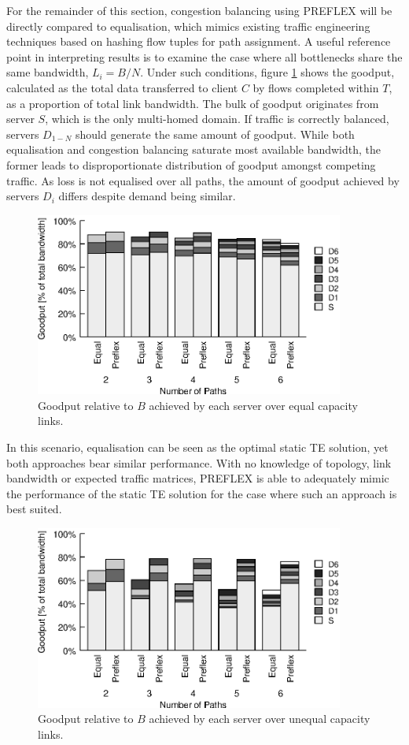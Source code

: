For the remainder of this section, congestion balancing using \ac{PREFLEX} will be directly compared to equalisation, which mimics existing traffic engineering techniques based on hashing flow tuples for path assignment.
A useful reference point in interpreting results is to examine the case where all bottlenecks share the same bandwidth, $L_i=B/N$.
Under such conditions, figure \ref{fig:goodputeq} shows the goodput, calculated as the total data transferred to client $C$ by flows completed within $T$, as a proportion of total link bandwidth.
The bulk of goodput originates from server $S$, which is the only multi-homed domain.
If traffic is correctly balanced, servers $D_{1-N}$ should generate the same amount of goodput.
While both equalisation and congestion balancing saturate most available bandwidth, the former leads to disproportionate distribution of goodput amongst competing traffic. 
As loss is not equalised over all paths, the amount of goodput achieved by servers $D_i$ differs despite demand being similar.
\begin{figure}
    \centering
    \includegraphics[width=4in]{figures/cate/eqbw}
    \caption[Goodput achieved over equal capacity links.]{Goodput relative to $B$ achieved by each server over equal capacity links.}
    \label{fig:goodputeq}
\end{figure}

In this scenario, equalisation can be seen as the optimal static TE solution, yet both approaches bear similar performance. 
With no knowledge of topology, link bandwidth or expected traffic matrices, \ac{PREFLEX} is able to adequately mimic the performance of the static TE solution for the case where such an approach is best suited.

\begin{figure}
    \centering
    \includegraphics[width=4in]{figures/cate/diffbw}
    \caption[Goodput achieved over unequal capacity links.]{Goodput relative to $B$ achieved by each server over unequal capacity links.}
    \label{fig:goodputdiff}
\end{figure}

